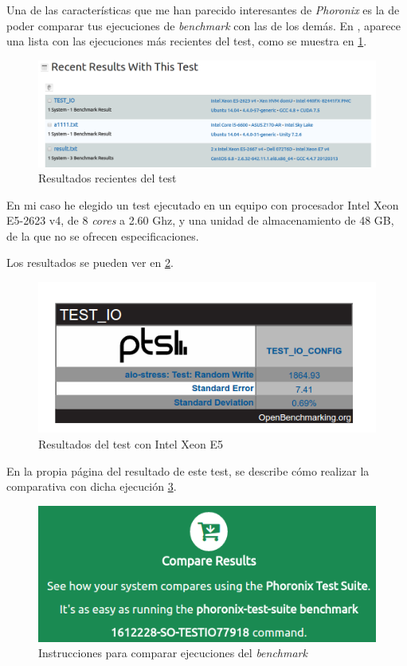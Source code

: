 Una de las características que me han parecido interesantes de \textit{Phoronix} es la de poder comparar tus ejecuciones de \textit{benchmark} con las de los demás.
En \cite{aio-stress}, aparece una lista con las ejecuciones más recientes del test, como se muestra en \ref{cuestion1-07}.

\begin{figure}[H]
	\centering
	\includegraphics[scale=0.45]{cuestion1-07.png}
	\caption{Resultados recientes del test} \label{cuestion1-07}
\end{figure}

En mi caso he elegido un test ejecutado en un equipo con procesador Intel Xeon E5-2623 v4, de 8 \textit{cores} a 2.60 Ghz, y una unidad de almacenamiento de 48 GB, de la que no se ofrecen especificaciones.

Los resultados se pueden ver en \ref{cuestion1-08}.

\begin{figure}[H]
	\centering
	\includegraphics[scale=0.6]{cuestion1-08.png}
	\caption{Resultados del test con Intel Xeon E5} \label{cuestion1-08}
\end{figure}

En la propia página del resultado de este test, se describe cómo realizar la comparativa con dicha ejecución \ref{cuestion1-09}.

\begin{figure}[H]
	\centering
	\includegraphics[scale=0.4]{cuestion1-09.png}
	\caption{Instrucciones para comparar ejecuciones del \textit{benchmark}} \label{cuestion1-09}
\end{figure}

